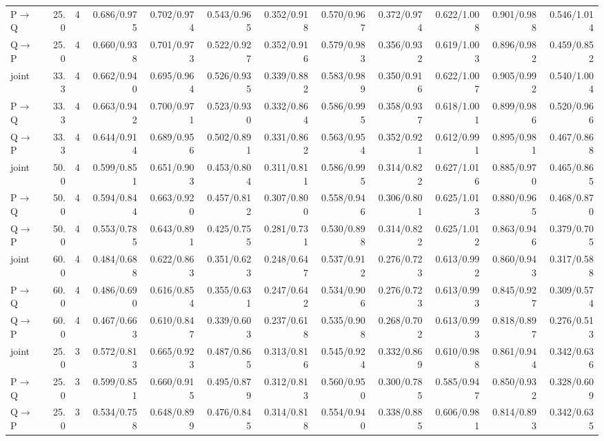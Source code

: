 \documentclass{article}
\begin{document}
\begin{longtable}{lrrrrrrrrrrr}
P$\to$Q & 25.0 & 4 & 0.686/0.975 & 0.702/0.974 & 0.543/0.965 & 0.352/0.918 & 0.570/0.967 & 0.372/0.974 & 0.622/1.008 & 0.901/0.988 & 0.546/1.014 \\
Q$\to$P & 25.0 & 4 & 0.660/0.938 & 0.701/0.973 & 0.522/0.927 & 0.352/0.916 & 0.579/0.983 & 0.356/0.932 & 0.619/1.003 & 0.896/0.982 & 0.459/0.852 \\
joint & 33.3 & 4 & 0.662/0.940 & 0.695/0.964 & 0.526/0.935 & 0.339/0.882 & 0.583/0.989 & 0.350/0.916 & 0.622/1.007 & 0.905/0.992 & 0.540/1.004 \\
P$\to$Q & 33.3 & 4 & 0.663/0.942 & 0.700/0.971 & 0.523/0.930 & 0.332/0.864 & 0.586/0.995 & 0.358/0.937 & 0.618/1.001 & 0.899/0.986 & 0.520/0.966 \\
Q$\to$P & 33.3 & 4 & 0.644/0.914 & 0.689/0.956 & 0.502/0.891 & 0.331/0.862 & 0.563/0.954 & 0.352/0.921 & 0.612/0.991 & 0.895/0.981 & 0.467/0.868 \\
joint & 50.0 & 4 & 0.599/0.851 & 0.651/0.903 & 0.453/0.804 & 0.311/0.811 & 0.586/0.995 & 0.314/0.822 & 0.627/1.016 & 0.885/0.970 & 0.465/0.865 \\
P$\to$Q & 50.0 & 4 & 0.594/0.844 & 0.663/0.920 & 0.457/0.812 & 0.307/0.800 & 0.558/0.946 & 0.306/0.801 & 0.625/1.013 & 0.880/0.965 & 0.468/0.870 \\
Q$\to$P & 50.0 & 4 & 0.553/0.785 & 0.643/0.891 & 0.425/0.755 & 0.281/0.731 & 0.530/0.898 & 0.314/0.822 & 0.625/1.012 & 0.863/0.946 & 0.379/0.705 \\
joint & 60.0 & 4 & 0.484/0.688 & 0.622/0.863 & 0.351/0.623 & 0.248/0.647 & 0.537/0.912 & 0.276/0.723 & 0.613/0.992 & 0.860/0.943 & 0.317/0.588 \\
P$\to$Q & 60.0 & 4 & 0.486/0.690 & 0.616/0.854 & 0.355/0.631 & 0.247/0.642 & 0.534/0.906 & 0.276/0.723 & 0.613/0.993 & 0.845/0.927 & 0.309/0.574 \\
Q$\to$P & 60.0 & 4 & 0.467/0.663 & 0.610/0.847 & 0.339/0.603 & 0.237/0.618 & 0.535/0.908 & 0.268/0.702 & 0.613/0.993 & 0.818/0.897 & 0.276/0.513 \\
joint & 25.0 & 3 & 0.572/0.813 & 0.665/0.923 & 0.487/0.865 & 0.313/0.816 & 0.545/0.924 & 0.332/0.869 & 0.610/0.988 & 0.861/0.944 & 0.342/0.636 \\
P$\to$Q & 25.0 & 3 & 0.599/0.851 & 0.660/0.915 & 0.495/0.879 & 0.312/0.813 & 0.560/0.950 & 0.300/0.785 & 0.585/0.947 & 0.850/0.932 & 0.328/0.609 \\
Q$\to$P & 25.0 & 3 & 0.534/0.758 & 0.648/0.899 & 0.476/0.845 & 0.314/0.818 & 0.554/0.940 & 0.338/0.885 & 0.606/0.981 & 0.814/0.893 & 0.342/0.635 \\

\end{longtable}
\end{document}
